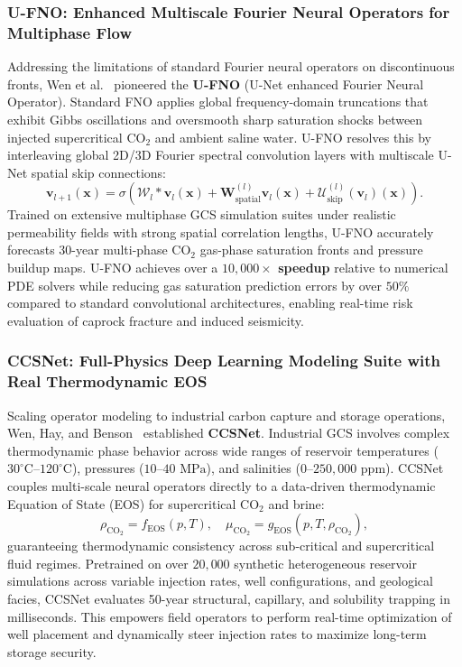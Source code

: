 \subsubsection{U-FNO: Enhanced Multiscale Fourier Neural Operators for Multiphase Flow}
Addressing the limitations of standard Fourier neural operators on discontinuous fronts, Wen et al.~\cite{wen2022ufno} pioneered the \textbf{U-FNO} (U-Net enhanced Fourier Neural Operator). Standard FNO applies global frequency-domain truncations that exhibit Gibbs oscillations and oversmooth sharp saturation shocks between injected supercritical $\text{CO}_2$ and ambient saline water. U-FNO resolves this by interleaving global 2D/3D Fourier spectral convolution layers with multiscale U-Net spatial skip connections:
\begin{equation}
    \mathbf{v}_{l+1}(\mathbf{x}) = \sigma\left( \mathcal{W}_l * \mathbf{v}_l(\mathbf{x}) + \mathbf{W}_{\text{spatial}}^{(l)} \mathbf{v}_l(\mathbf{x}) + \mathcal{U}_{\text{skip}}^{(l)}(\mathbf{v}_l)(\mathbf{x}) \right).
    \label{eq:ufno_layer}
\end{equation}
Trained on extensive multiphase GCS simulation suites under realistic permeability fields with strong spatial correlation lengths, U-FNO accurately forecasts 30-year multi-phase $\text{CO}_2$ gas-phase saturation fronts and pressure buildup maps. U-FNO achieves over a \textbf{$10{,}000\times$ speedup} relative to numerical PDE solvers while reducing gas saturation prediction errors by over $50\%$ compared to standard convolutional architectures, enabling real-time risk evaluation of caprock fracture and induced seismicity.

\subsubsection{CCSNet: Full-Physics Deep Learning Modeling Suite with Real Thermodynamic EOS}
Scaling operator modeling to industrial carbon capture and storage operations, Wen, Hay, and Benson~\cite{wen2021ccsnet} established \textbf{CCSNet}. Industrial GCS involves complex thermodynamic phase behavior across wide ranges of reservoir temperatures ($30^\circ\text{C}\text{--}120^\circ\text{C}$), pressures ($10\text{--}40\text{ MPa}$), and salinities ($0\text{--}250{,}000\text{ ppm}$). CCSNet couples multi-scale neural operators directly to a data-driven thermodynamic Equation of State (EOS) for supercritical $\text{CO}_2$ and brine:
\begin{equation}
    \rho_{\text{CO}_2} = f_{\text{EOS}}(p, T), \quad \mu_{\text{CO}_2} = g_{\text{EOS}}(p, T, \rho_{\text{CO}_2}),
\end{equation}
guaranteeing thermodynamic consistency across sub-critical and supercritical fluid regimes. Pretrained on over $20{,}000$ synthetic heterogeneous reservoir simulations across variable injection rates, well configurations, and geological facies, CCSNet evaluates 50-year structural, capillary, and solubility trapping in milliseconds. This empowers field operators to perform real-time optimization of well placement and dynamically steer injection rates to maximize long-term storage security.

